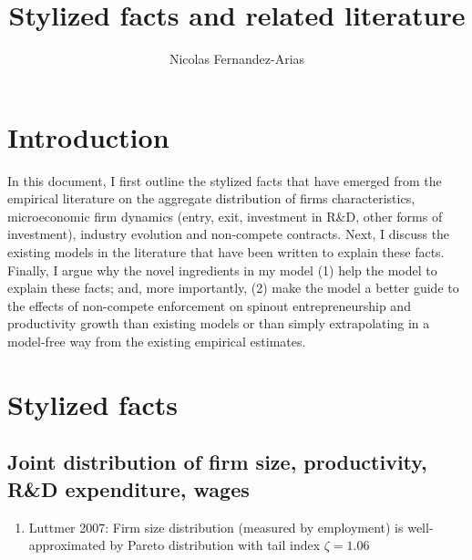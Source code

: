 \documentclass[12pt,english]{article}
\theoremstyle{remark}
\begin{document}
\title{Stylized facts and related literature}
\author{Nicolas Fernandez-Arias}
\maketitle

\section{Introduction}

In this document, I first outline the stylized facts that have emerged from the empirical literature on the aggregate distribution of firms characteristics, microeconomic firm dynamics (entry, exit, investment in R\&D, other forms of investment), industry evolution and non-compete contracts. Next, I discuss the existing models in the literature that have been written to explain these facts. Finally, I argue why the novel ingredients in my model (1) help the model to explain these facts; and, more importantly, (2) make the model a better guide to the effects of non-compete enforcement on spinout entrepreneurship and productivity growth than existing models or than simply extrapolating in a model-free way from the existing empirical estimates.

\section{Stylized facts}
\subsection{Joint distribution of firm size, productivity, R\&D expenditure, wages}

\begin{enumerate}
	\item Luttmer 2007: Firm size distribution (measured by employment) is well-approximated by Pareto distribution with tail index $\zeta = 1.06$
\end{enumerate}
\end{document}
